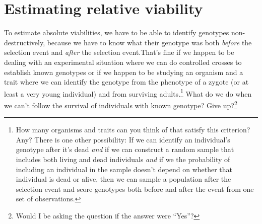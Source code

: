 \documentclass[12pt]{article}
\begin{document}
\section*{Estimating relative viability}

To estimate absolute viabilities, we have to be able to identify
genotypes non-destructively, because we have to know what their
genotype was both {\it before\/} the selection event and {\it after\/}
the selection event.That's fine if we happen to be dealing with an
experimental situation where we can do controlled crosses to establish
known genotypes or if we happen to be studying an organism and a trait
where we can identify the genotype from the phenotype of a zygote (or
at least a very young individual) and from surviving
adults.\footnote{How many organisms and traits can you think of that
  satisfy this criterion? Any? There is one other possibility: If we
  can identify an individual's genotype after it's dead {\it and\/} if
  we can construct a random sample that includes both living and dead
  individuals {\it and\/} if we the probability of including an
  individual in the sample doesn't depend on whether that individual
  is dead or alive, then we can sample a population after the
  selection event and score genotypes both before and after the event
  from one set of observations.} What do we do when we can't follow
the survival of individuals with known genotype? Give
up?\footnote{Would I be asking the question if the answer were
  ``Yes''?}
\end{document}
